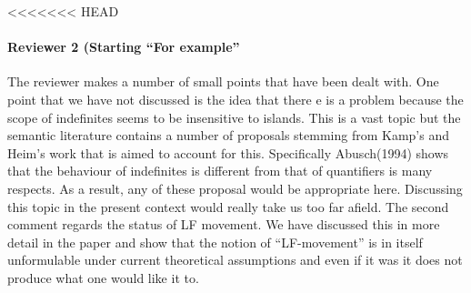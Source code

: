 \documentclass[11pt]{article}
\begin{document}
<<<<<<< HEAD
\paragraph{Reviewer 2 (Starting ``For example''}  The reviewer makes a number of small points that have been dealt with.  One point that we have not discussed is the idea that there e is a problem because the scope of indefinites seems to be insensitive to islands.  This is a vast topic but the semantic literature contains a number of proposals stemming from Kamp's and Heim's work that is aimed to account for this.  Specifically Abusch(1994) shows that the behaviour of indefinites is different from that of quantifiers is many respects.  As a result, any of these proposal would be appropriate here.  Discussing this topic in the present context would really take us too far afield.
The second comment regards the status of LF movement.  We have discussed this in more detail in the paper and show that the notion of ``LF-movement'' is in itself unformulable under current theoretical assumptions and even if it was it does not produce what one would like it to.
\end{document}
